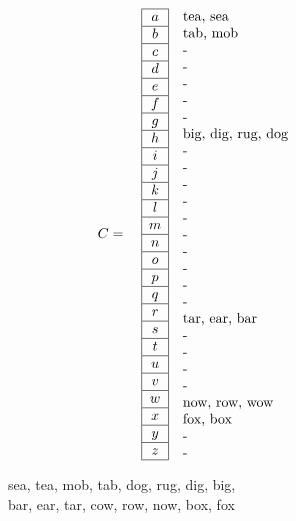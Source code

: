 \documentclass{article}
\begin{document}
\[
C = \quad
\begin{array}{|c|}
\hline
a \\ \hline
b \\ \hline
c \\ \hline
d \\ \hline
e \\ \hline
f \\ \hline
g \\ \hline
h \\ \hline
i \\ \hline
j \\ \hline
k \\ \hline
l \\ \hline
m \\ \hline
n \\ \hline
o \\ \hline
p \\ \hline
q \\ \hline
r \\ \hline
s \\ \hline
t \\ \hline
u \\ \hline
v \\ \hline
w \\ \hline
x \\ \hline
y \\ \hline
z \\ \hline
\end{array}
\quad
\begin{minipage}{6cm}
\raggedright %
tea, sea\\%
tab, mob\\%
-\\%
-\\%
-\\%
-\\%
-\\%
big, dig, rug, dog\\%
-\\%
-\\%
-\\%
-\\%
-\\%
-\\%
-\\%
-\\%
-\\%
-\\%
tar, ear, bar\\%
-\\%
-\\%
-\\%
-\\%
now, row, wow\\%
fox, box\\%
-\\%
-\\%
\end{minipage}
\]
\begin{center}
    sea, tea, mob, tab, dog, rug, dig, big, \\
    bar, ear, tar, cow, row, now, box, fox
\end{center}
\end{document}
